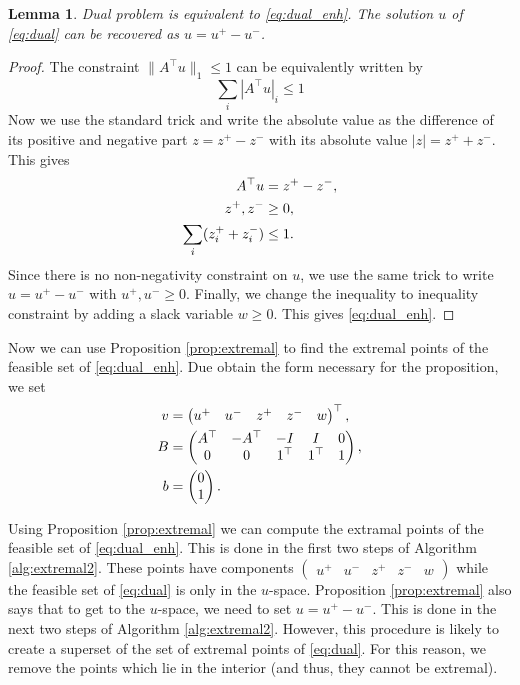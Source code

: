 \documentclass[journal]{IEEEtranTIE}
\newtheorem{lemma}[thm]{Lemma}
\theoremstyle{definition}
\newcommand{\nrm}[1]{|#1|}
\newcommand{\norm}[1]{\|#1\|}
\begin{document}
\begin{lemma}\label{lemma:dual_enh}
Dual problem is equivalent to \eqref{eq:dual_enh}. The solution $u$ of \eqref{eq:dual} can be recovered as $u = u^+ - u^-$.
\end{lemma}
\begin{proof}
  The constraint $\norm{A^\top u}_1 \le 1$ can be equivalently written by
  $$
    \sum_i \nrm{A^\top u}_i \le 1
  $$
  Now we use the standard trick and write the absolute value as the difference of its positive and negative part $z=z^+-z^-$ with its absolute value $\nrm{z}=z^++z^-$. This gives
  $$
    \aligned
    A^\top u &= z^+ - z^-, \\
    z^+, z^- &\ge 0, \\
    \sum_i (z_i^+ + z_i^-) &\le 1.
    \endaligned
  $$
  Since there is no non-negativity constraint on $u$, we use the same trick to write $u=u^+-u^-$ with $u^+,u^-\ge 0$. Finally, we change the inequality to inequality constraint by adding a slack variable $w\ge 0$. This gives \eqref{eq:dual_enh}.
\end{proof}

Now we can use Proposition \ref{prop:extremal} to find the extremal points of the feasible set of \eqref{eq:dual_enh}. Due obtain the form necessary for the proposition, we set
\begin{equation}\label{eq:enh_matrices}
  \aligned
  v &= \begin{pmatrix} u^+ & u^- & z^+& z^- & w \end{pmatrix}^\top, \\
  B &= \begin{pmatrix} A^\top & -A^\top & -I & I & 0 \\ 0 & 0 & 1^\top & 1^\top & 1 \end{pmatrix}, \\
  b &= \begin{pmatrix}0\\1 \end{pmatrix}.
  \endaligned
\end{equation}

Using Proposition \ref{prop:extremal} we can compute the extramal points of the feasible set of \eqref{eq:dual_enh}. This is done in the first two steps of Algorithm \ref{alg:extremal2}. These points have components $\begin{pmatrix} u^+ & u^- & z^+& z^- & w \end{pmatrix}$ while the feasible set of \eqref{eq:dual} is only in the $u$-space. Proposition \ref{prop:extremal} also says that to get to the $u$-space, we need to set $u=u^+-u^-$. This is done in the next two steps of Algorithm \ref{alg:extremal2}. However, this procedure is likely to create a superset of the set of extremal points of \eqref{eq:dual}. For this reason, we remove the points which lie in the interior (and thus, they cannot be extremal).
\end{document}

